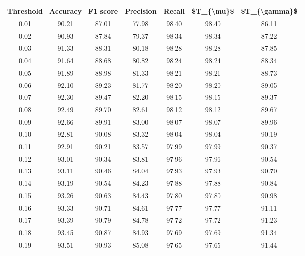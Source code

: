 \begin{tabular}{|c|c|c|c|c|c|c|}
\hline
 Threshold &  Accuracy &  F1 score &  Precision &  Recall &  \$T\_\{\textbackslash mu\}\$ &  \$T\_\{\textbackslash gamma\}\$ \\
\hline
      0.01 &     90.21 &     87.01 &      77.98 &   98.40 &      98.40 &         86.11 \\
      0.02 &     90.93 &     87.84 &      79.37 &   98.34 &      98.34 &         87.22 \\
      0.03 &     91.33 &     88.31 &      80.18 &   98.28 &      98.28 &         87.85 \\
      0.04 &     91.64 &     88.68 &      80.82 &   98.24 &      98.24 &         88.34 \\
      0.05 &     91.89 &     88.98 &      81.33 &   98.21 &      98.21 &         88.73 \\
      0.06 &     92.10 &     89.23 &      81.77 &   98.20 &      98.20 &         89.05 \\
      0.07 &     92.30 &     89.47 &      82.20 &   98.15 &      98.15 &         89.37 \\
      0.08 &     92.49 &     89.70 &      82.61 &   98.12 &      98.12 &         89.67 \\
      0.09 &     92.66 &     89.91 &      83.00 &   98.07 &      98.07 &         89.96 \\
      0.10 &     92.81 &     90.08 &      83.32 &   98.04 &      98.04 &         90.19 \\
      0.11 &     92.91 &     90.21 &      83.57 &   97.99 &      97.99 &         90.37 \\
      0.12 &     93.01 &     90.34 &      83.81 &   97.96 &      97.96 &         90.54 \\
      0.13 &     93.11 &     90.46 &      84.04 &   97.93 &      97.93 &         90.70 \\
      0.14 &     93.19 &     90.54 &      84.23 &   97.88 &      97.88 &         90.84 \\
      0.15 &     93.26 &     90.63 &      84.43 &   97.80 &      97.80 &         90.98 \\
      0.16 &     93.33 &     90.71 &      84.61 &   97.77 &      97.77 &         91.11 \\
      0.17 &     93.39 &     90.79 &      84.78 &   97.72 &      97.72 &         91.23 \\
      0.18 &     93.45 &     90.87 &      84.93 &   97.69 &      97.69 &         91.34 \\
      0.19 &     93.51 &     90.93 &      85.08 &   97.65 &      97.65 &         91.44 \\

\end{tabular}
